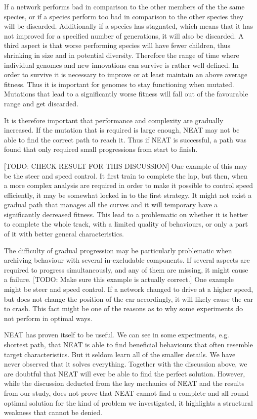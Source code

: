 If a network performs bad in comparison to the other members of the the same species, or if a species perform too bad in comparison to the other species they will be discarded\cite{stanley:neat}. Additionally if a species has stagnated, which means that it has not improved for a specified number of generations, it will also be discarded. A third aspect is that worse performing species will have fewer children, thus shrinking in size and in potential diversity. Therefore the range of time where individual genomes and new innovations can survive is rather well defined. In order to survive it is necessary to improve or at least maintain an above average fitness. Thus it is important for genomes to stay functioning when mutated. Mutations that lead to a significantly worse fitness will fall out of the favourable range and get discarded. 

It is therefore important that performance and complexity are gradually increased. If the mutation that is required is large enough, NEAT may not be able to find the correct path to reach it. Thus if NEAT is successful, a path was found that only required small progressions from start to finish.

[TODO: CHECK RESULT FOR THIS DISCUSSION] One example of this may be the steer and speed control. It first train to complete the lap, but then, when a more complex analysis are required in order to make it possible to control speed efficiently, it may be somewhat locked in to the first strategy. It might not exist a gradual path that manages all the curves and it will temporary have a significantly decreased fitness. This lead to a problematic on whether it is better to complete the whole track, with a limited quality of behaviours, or only a part of it with better general characteristics.

The difficulty of gradual progression may be particularly problematic when archiving behaviour with several in-excludable components. If several aspects are required to progress simultaneously, and any of them are missing, it might cause a failure. [TODO: Make sure this example is actually correct.] One example might be steer and speed control. If a network changed to drive at a higher speed, but does not change the position of the car accordingly, it will likely cause the car to crash. This fact might be one of the reasons as to why some experiments do not perform in optimal ways.

NEAT has proven itself to be useful. We can see in some experiments, e.g. shortest path, that NEAT is able to find beneficial behaviours that often resemble target characteristics. But it seldom learn all of the smaller details. We have never observed that it solves everything. Together with the discussion above, we are doubtful that NEAT will ever be able to find the perfect solution. However, while the discussion deducted from the key mechanics of NEAT and the results from our study, does not prove that NEAT cannot find a complete and all-round optimal solution for the kind of problem we investigated, it highlights a structural weakness that cannot be denied.


